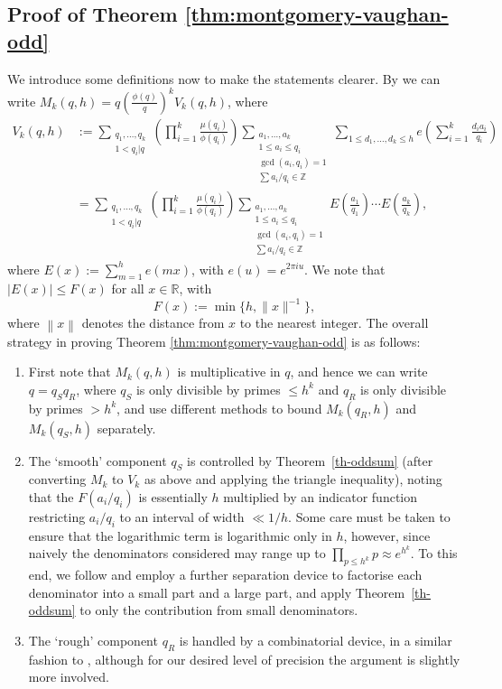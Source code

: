 \documentclass[11pt,letterpaper]{amsart}
\newcommand{\norm}[1]{\left\lVert #1\right\rVert}
\newcommand{\subsum}[1]{\sum_{\substack{#1}}}
\newcommand{\ogcd}[2]{\gcd(#1,#2)}
\theoremstyle{definition}
\begin{document}
\subsection{Proof of Theorem \ref{thm:montgomery-vaughan-odd}}
We introduce some definitions now to make the statements clearer. By \cite[Lemma 2]{MV86} we can write $M_k(q,h) =  q(\frac{\phi(q)}{q})^k V_{k}(q,h)$, where
\begin{align}
V_k(q,h) &:= \subsum{q_1, \dots, q_k \\ 1 < q_i|q} \left(\prod_{i=1}^k \frac{\mu(q_i)}{\phi(q_i)}\right)\subsum{a_1, \dots, a_k \\ 1 \le a_i \le q_i \\ \ogcd{a_i}{q_i} = 1 \\ \sum a_i/q_i \in \mathbb Z} \sum_{1 \le d_1, \ldots, d_k \le h} e\left(\sum_{i=1}^k \frac{d_ia_i}{q_i}\right) \label{eq-defn-of-Vkqh} \\
&= \subsum{q_1, \dots, q_k \\ 1 < q_i|q} \left(\prod_{i=1}^k \frac{\mu(q_i)}{\phi(q_i)}\right)\subsum{a_1, \dots, a_k \\ 1 \le a_i \le q_i \\ \ogcd{a_i}{q_i} = 1 \\ \sum a_i/q_i \in \mathbb Z} E\left(\frac{a_1}{q_1}\right) \cdots E\left(\frac{a_k}{q_k}\right),\nonumber
\end{align}
where $E(x) := \sum_{m=1}^h e(mx)$, with $e(u) = e^{2\pi i u}$. We note that $\lvert E(x)\rvert \leq F(x)$ for all $x\in \mathbb{R}$, with \begin{equation*}
F(x) := \min\{h,\|x\|^{-1}\},
\end{equation*}
where $\norm{x}$ denotes the distance from $x$ to the nearest integer. The overall strategy in proving Theorem \ref{thm:montgomery-vaughan-odd} is as follows:
\begin{enumerate}
\item First note that $M_k(q,h)$ is multiplicative in $q$, and hence we can write $q=q_Sq_R$, where $q_S$ is only divisible by primes $\leq h^k$ and $q_R$ is only divisible by primes $>h^k$, and use different methods to bound $M_k(q_R,h)$ and $M_k(q_S,h)$ separately.
\item The `smooth' component $q_S$ is controlled by Theorem~\ref{th-oddsum} (after converting $M_k$ to $V_k$ as above and applying the triangle inequality), noting that the $F(a_i/q_i)$ is essentially $h$ multiplied by an indicator function restricting $a_i/q_i$ to an interval of width $\ll 1/h$. Some care must be taken to ensure that the logarithmic term is logarithmic only in $h$, however, since naively the denominators considered may range up to $\prod_{p\leq h^k}p\approx e^{h^k}$. To this end, we follow \cite{MV86} and employ a further separation device to factorise each denominator into a small part and a large part, and apply Theorem~\ref{th-oddsum} to only the contribution from small denominators.
\item The `rough' component $q_R$ is handled by a combinatorial device, in a similar fashion to \cite{MV86}, although for our desired level of precision the argument is slightly more involved. 
\end{enumerate}
\end{document}
